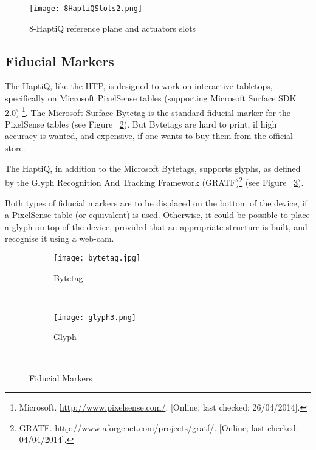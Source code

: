 \begin{figure}[H]
  \centering
  \texttt{[image: 8HaptiQSlots2.png]}
  \caption{8-HaptiQ reference plane and actuators slots}
  \label{fig:8haptiqref}
\end{figure}

\subsection{Fiducial Markers}

The HaptiQ, like the HTP, is designed to work on interactive tabletops, specifically on Microsoft PixelSense tables (supporting Microsoft Surface SDK 2.0) \footnote{Microsoft. \url{http://www.pixelsense.com/}. [Online; last checked: 26/04/2014].}. The Microsoft Surface Bytetag is the standard fiducial marker for the PixelSense tables (see Figure ~\ref{fig:Bytetag}). But Bytetags are hard to print, if high accuracy is wanted, and expensive, if one wants to buy them from the official store.

The HaptiQ, in addition to the  Microsoft Bytetags, supports glyphs, as defined by the Glyph Recognition And Tracking Framework (GRATF)\footnote{GRATF. \url{http://www.aforgenet.com/projects/gratf/}. [Online; last checked: 04/04/2014].} (see Figure ~\ref{fig:glyph}).

Both types of fiducial markers are to be displaced on the bottom of the device, if a PixelSense table (or equivalent) is used. Otherwise, it could be possible to place a glyph on top of the device, provided that an appropriate structure is built, and recognise it using a web-cam. 

\begin{figure}[H]
        \centering
        \begin{subfigure}[H]{0.3\textwidth}
                \texttt{[image: bytetag.jpg]}
                \caption{Bytetag}
                \label{fig:Bytetag}
        \end{subfigure}%
        ~ %
        \begin{subfigure}[H]{0.3\textwidth}
                \texttt{[image: glyph3.png]}
                \caption{Glyph}
                \label{fig:glyph}
        \end{subfigure}
        ~ %
        \caption{Fiducial Markers}
        \label{fig:fiducialMarkers}
\end{figure}

